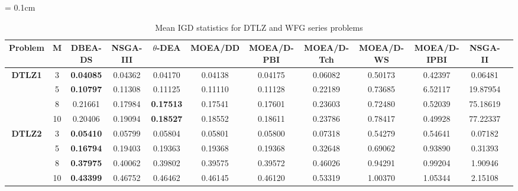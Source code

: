 \documentclass{sig-alternate}
\begin{document}
\begin{table}[!htb]\scriptsize
	\centering
	\renewcommand{\arraystretch}{0.9}
	\caption{Mean IGD statistics for DTLZ and WFG series problems}
	\label{tab:IGD}
	\tabcolsep = 0.1cm
	\begin{tabular}{|c|c|c|c|c|c|c|c|c|c|c|c|}
		\noalign{\smallskip}\hline
		\textbf{Problem}                & \textbf{M} & \textbf{DBEA-DS} & \textbf{NSGA-III} & \textbf{$\theta$-DEA} & \textbf{MOEA/DD} & \textbf{MOEA/D-PBI} & \textbf{MOEA/D-Tch} & \textbf{MOEA/D-WS} & \textbf{MOEA/D-IPBI} & \textbf{NSGA-II} \\ \hline
		\multirow{4}{*}{\textbf{DTLZ1}} & 3          & \textbf{0.04085} & 0.04362           & 0.04170               & 0.04138          & 0.04175             & 0.06082             & 0.50173            & 0.42397              & 0.06481          \\ \cline{2-11} 
		& 5          & \textbf{0.10797} & 0.11308           & 0.11125               & 0.11110          & 0.11128             & 0.22189             & 0.73685            & 6.52117              & 19.87954         \\ \cline{2-11} 
		& 8          & 0.21661          & 0.17984           & \textbf{0.17513}      & 0.17541          & 0.17601             & 0.23603             & 0.72480            & 0.52039              & 75.18619         \\ \cline{2-11} 
		& 10         & 0.20406          & 0.19094           & \textbf{0.18527}      & 0.18552          & 0.18611             & 0.23786             & 0.78417            & 0.49928              & 77.22337         \\ \hline
		\multirow{4}{*}{\textbf{DTLZ2}} & 3          & \textbf{0.05410} & 0.05799           & 0.05804               & 0.05801          & 0.05800             & 0.07318             & 0.54279            & 0.54641              & 0.07182          \\ \cline{2-11} 
		& 5          & \textbf{0.16794} & 0.19403           & 0.19363               & 0.19368          & 0.19368             & 0.32648             & 0.69062            & 0.93890              & 0.31393          \\ \cline{2-11} 
		& 8          & \textbf{0.37975} & 0.40062           & 0.39802               & 0.39575          & 0.39572             & 0.46026             & 0.94291            & 0.99204              & 1.90946          \\ \cline{2-11} 
		& 10         & \textbf{0.43399} & 0.46752           & 0.46462               & 0.46145          & 0.46120             & 0.53319             & 1.00370            & 1.05344              & 2.15108          \\ \hline

\end{tabular}
\end{table}
\end{document}
